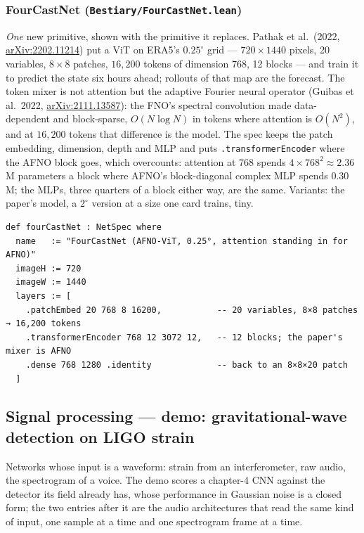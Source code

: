 \subsubsection*{FourCastNet (\texttt{Bestiary/FourCastNet.lean})}
\emph{One} new primitive, shown with the primitive it replaces. Pathak et
al.\ (2022, \href{https://arxiv.org/abs/2202.11214}{arXiv:2202.11214}) put a
ViT on ERA5's $0.25^\circ$ grid --- $720 \times 1440$ pixels, 20 variables, $8
\times 8$ patches, $16{,}200$ tokens of dimension 768, 12 blocks --- and train
it to predict the state six hours ahead; rollouts of that map are the
forecast. The token mixer is not attention but the adaptive Fourier neural
operator (Guibas et al.\ 2022,
\href{https://arxiv.org/abs/2111.13587}{arXiv:2111.13587}): the FNO's
spectral convolution made data-dependent and block-sparse, $O(N \log N)$ in
tokens where attention is $O(N^2)$, and at $16{,}200$ tokens that difference
is the model. The spec keeps the patch embedding, dimension, depth and MLP
and puts \texttt{.transformerEncoder} where the AFNO block goes, which
overcounts: attention at 768 spends $4 \times 768^2 \approx 2.36$\,M
parameters a block where AFNO's block-diagonal complex MLP spends $0.30$\,M;
the MLPs, three quarters of a block either way, are the same. Variants: the
paper's model, a $2^\circ$ version at a size one card trains, tiny.

\begin{verbatim}
def fourCastNet : NetSpec where
  name   := "FourCastNet (AFNO-ViT, 0.25°, attention standing in for AFNO)"
  imageH := 720
  imageW := 1440
  layers := [
    .patchEmbed 20 768 8 16200,           -- 20 variables, 8×8 patches → 16,200 tokens
    .transformerEncoder 768 12 3072 12,   -- 12 blocks; the paper's mixer is AFNO
    .dense 768 1280 .identity             -- back to an 8×8×20 patch
  ]
\end{verbatim}

\subsection{Signal processing --- demo: gravitational-wave detection on LIGO strain}
\label{sec:bestiary_signal}

Networks whose input is a waveform: strain from an interferometer, raw
audio, the spectrogram of a voice. The demo scores a chapter-4 CNN against
the detector its field already has, whose performance in Gaussian noise is a
closed form; the two entries after it are the audio architectures that read
the same kind of input, one sample at a time and one spectrogram frame at a
time.

